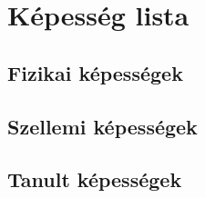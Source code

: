 






\pagestyle{empty}


\clearpage

\setmainfont[Ligatures=TeX,Scale=1.4]{EB Garamond}

\tableofcontents 

\pagestyle{fancy}
\renewcommand{\chaptermark}[1]{\markboth{#1}{}}
\setmainfont[Ligatures=TeX,Scale=1.4]{EB Garamond}


\clearpage

\clearpage

\clearpage


\clearpage

\clearpage

\clearpage

\chapter{Képesség lista}
\section{Fizikai képességek}

\clearpage

\clearpage

\clearpage

\clearpage

\clearpage

\clearpage
\section{Szellemi képességek}

\clearpage

\clearpage

\clearpage
\section{Tanult képességek}
\clearpage


\clearpage

\clearpage

\clearpage

